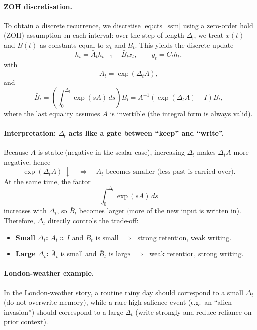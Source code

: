 \documentclass[a4paper,11pt]{article}
\begin{document}
\paragraph{ZOH discretisation.}
To obtain a discrete recurrence, we discretise \eqref{eq:cts_ssm} using a zero-order hold (ZOH) assumption on each interval:
over the step of length $\Delta_t$, we treat $x(t)$ and $B(t)$ as constants equal to $x_t$ and $B_t$.
This yields the discrete update
\begin{equation}
    h_t = \bar{A}_t h_{t-1} + \bar{B}_t x_t,
    \qquad
    y_t = C_t h_t,
    \label{eq:dts_ssm}
\end{equation}
with
\begin{equation}
    \bar{A}_t = \exp(\Delta_t A),
    \label{eq:Atbar}
\end{equation}
and
\begin{equation}
    \bar{B}_t 
    = \left(\int_{0}^{\Delta_t}\exp(sA)\,ds\right) B_t
    = A^{-1}\!\left(\exp(\Delta_t A)-I\right) B_t,
    \label{eq:Btbar}
\end{equation}
where the last equality assumes $A$ is invertible (the integral form is always valid).

\paragraph{Interpretation: $\Delta_t$ acts like a gate between ``keep'' and ``write''.}
Because $A$ is stable (negative in the scalar case), increasing $\Delta_t$ makes $\Delta_t A$ more negative, hence
\[
\exp(\Delta_t A) \;\downarrow
\quad \Rightarrow \quad
\bar{A}_t \text{ becomes smaller (less past is carried over).}
\]
At the same time, the factor
\[
\int_{0}^{\Delta_t}\exp(sA)\,ds
\]
increases with $\Delta_t$, so $\bar{B}_t$ becomes larger (more of the new input is written in).
Therefore, $\Delta_t$ directly controls the trade-off:
\begin{itemize}
    \item \textbf{Small $\Delta_t$:} $\bar{A}_t \approx I$ and $\bar{B}_t$ is small $\;\Rightarrow\;$ strong retention, weak writing.
    \item \textbf{Large $\Delta_t$:} $\bar{A}_t$ is small and $\bar{B}_t$ is large $\;\Rightarrow\;$ weak retention, strong writing.
\end{itemize}

\paragraph{London-weather example.}
In the London-weather story, a routine rainy day should correspond to a small $\Delta_t$ (do not overwrite memory), while a rare high-salience event (e.g.\ an ``alien invasion'') should correspond to a large $\Delta_t$ (write strongly and reduce reliance on prior context).
\end{document}
